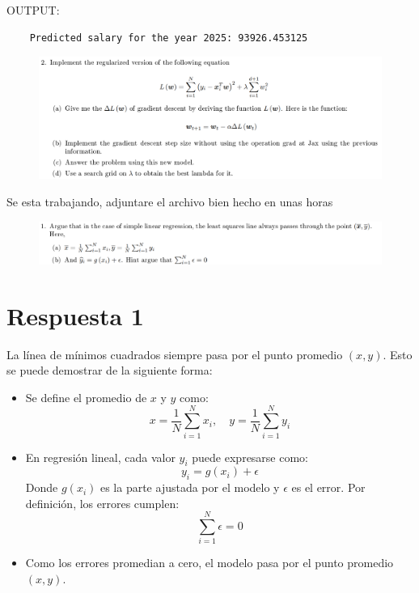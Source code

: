 \documentclass[12pt]{report}
\begin{document}
OUTPUT:

\begin{lstlisting}
	Predicted salary for the year 2025: 93926.453125
\end{lstlisting}

\begin{figure}[H]
	\centering
	\includegraphics[width=1\textwidth]{screenshot002}
\end{figure}

Se esta trabajando, adjuntare el archivo bien hecho en unas horas

\begin{figure}[H]
	\centering
	\includegraphics[width=1\textwidth]{screenshot003}
\end{figure}

\section*{Respuesta 1}
La línea de mínimos cuadrados siempre pasa por el punto promedio \((x, y)\). Esto se puede demostrar de la siguiente forma:

\begin{itemize}
	\item Se define el promedio de \(x\) y \(y\) como:
	\[
	x = \frac{1}{N} \sum_{i=1}^N x_i, \quad y = \frac{1}{N} \sum_{i=1}^N y_i
	\]
	\item En regresión lineal, cada valor \(y_i\) puede expresarse como:
	\[
	y_i = g(x_i) + \epsilon
	\]
	Donde \(g(x_i)\) es la parte ajustada por el modelo y \(\epsilon\) es el error. Por definición, los errores cumplen:
	\[
	\sum_{i=1}^N \epsilon = 0
	\]
	\item Como los errores promedian a cero, el modelo pasa por el punto promedio \((x, y)\).
\end{itemize}
\end{document}
